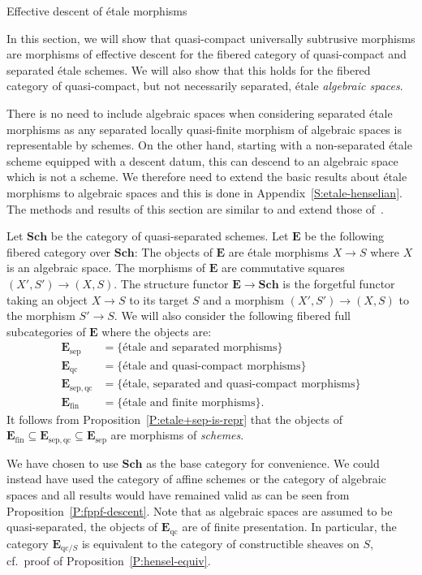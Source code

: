 \documentclass[a4paper,twoside,11pt]{amsart}[2009/07/02] %
\newcommand{\pref}[1]{\eqref{#1}}
\newcommand{\etale}{\'{e}tale}
\newcommand{\Sch}{\mathbf{Sch}} %
\newcommand{\sep}{\mathrm{sep}}
\newcommand{\catE}{\mathbf{E}}
\newcommand{\qc}{\mathrm{qc}}
\newcommand{\finite}{\mathrm{fin}}
\begin{document}
\begin{section}{Effective descent of \etale{} morphisms}\label{S:descent}

In this section, we will show that quasi-compact universally subtrusive
morphisms are morphisms of effective descent for the fibered category of
quasi-compact and separated \etale{} schemes. We will also show that this holds
for the fibered category of quasi-compact, but not necessarily separated,
\etale{} \emph{algebraic spaces}.

There is no need to include algebraic spaces when considering separated
\etale{} morphisms as any separated locally quasi-finite morphism of algebraic
spaces is representable by schemes. On the other hand, starting with a
non-separated \etale{} scheme equipped with a descent datum, this can descend
to an algebraic space which is not a scheme. We therefore need to extend the
basic results about \etale{} morphisms to algebraic spaces and this is done in
Appendix~\ref{S:etale-henselian}. The methods and results of this section are
similar to and extend those of~\cite[Exp.~IX]{sga1}.

\begin{notation}
Let $\Sch$ be the category of quasi-separated schemes. Let $\catE$ be the
following fibered category over $\Sch$: The objects of $\catE$ are \etale{}
morphisms $X\to S$ where $X$ is an algebraic space. The morphisms of $\catE$
are commutative squares $(X',S')\to (X,S)$. The structure functor
$\catE\to\Sch$ is the forgetful functor taking an object $X\to S$ to its target
$S$ and a morphism $(X',S')\to (X,S)$ to the morphism $S'\to S$.
We will also consider the following fibered full subcategories of $\catE$ where
the objects are:
%
\begin{align*}
\catE_{\sep} &= \{ \text{\etale{} and separated morphisms} \} \\
\catE_{\qc} &= \{ \text{\etale{} and quasi-compact morphisms} \} \\
\catE_{\sep,\qc} &= \{ \text{\etale{}, separated and
quasi-compact morphisms} \} \\
\catE_{\finite} &= \{ \text{\etale{} and finite morphisms} \}.
\end{align*}
%
It follows from Proposition~\pref{P:etale+sep-is-repr} that the objects of
$\catE_{\finite}\subseteq \catE_{\sep,\qc}\subseteq \catE_{\sep}$ are morphisms
of \emph{schemes}.
\end{notation}

\begin{remark}
We have chosen to use $\Sch$ as the base category for convenience. We could
instead have used the category of affine schemes or the category of algebraic
spaces and all results would have remained valid as can be seen from
Proposition~\pref{P:fppf-descent}.
%
Note that as algebraic spaces are assumed to be quasi-separated, the objects of
$\catE_{\qc}$ are of finite presentation. In particular, the category
$\catE_{\qc/S}$ is equivalent to the category of constructible sheaves on
$S$, cf.\ proof of Proposition~\pref{P:hensel-equiv}.
\end{remark}


\end{section}
\end{document}
